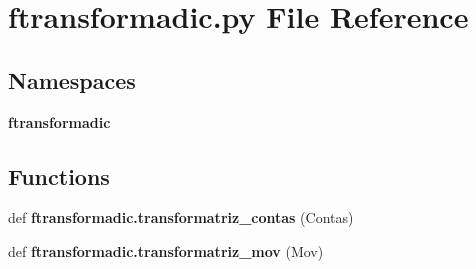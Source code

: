 \section{ftransformadic.\+py File Reference}
\label{ftransformadic_8py}
\subsection*{Namespaces}
\begin{DoxyCompactItemize}
\item 
 \textbf{ ftransformadic}
\end{DoxyCompactItemize}
\subsection*{Functions}
\begin{DoxyCompactItemize}
\item 
def \textbf{ ftransformadic.\+transformatriz\+\_\+contas} (Contas)
\item 
def \textbf{ ftransformadic.\+transformatriz\+\_\+mov} (Mov)
\end{DoxyCompactItemize}
